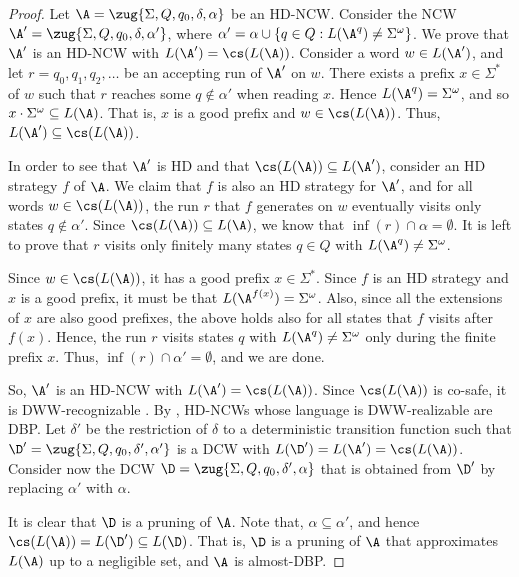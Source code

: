 \documentclass{lmcs}
\begin{document}
\begin{proof}Let $\A=\zug{\Sigma,Q,q_0,\delta,\alpha}$ be an HD-NCW. Consider the NCW $\A'=\zug{\Sigma,Q,q_0,\delta,\alpha'}$, where $\alpha'= \alpha\cup \{q\in Q : L(\A^q)\neq \Sigma^\omega\}$. We prove that $\A'$ is an HD-NCW with $L(\A')=\cs(L(\A))$. 
Consider a word $w\in L(\A')$, and let $r=q_0,q_1,q_2,\ldots$ be an accepting run of $\A'$ on $w$. There exists a prefix $x\in \Sigma^*$  of $w$ such that $r$ reaches some $q\notin \alpha'$ when reading $x$. Hence $L(\A^q)=\Sigma^\omega$, and so $x\cdot \Sigma^\omega\subseteq L(\A)$. That is, $x$ is a good prefix and $w\in \cs(L(\A))$. Thus, $L(\A')\subseteq \cs(L(\A))$. 

In order to see that $\A'$ is HD and that $\cs(L(\A))\subseteq L(\A')$, consider an HD strategy $f$ of $\A$. We claim that $f$ is also an HD strategy for $\A'$, and for all words $w\in \cs(L(\A))$, the run $r$ that $f$ generates on $w$ eventually visits only states $q\notin \alpha'$. Since $\cs(L(\A))\subseteq L(\A)$, we know that $\inf(r)\cap \alpha=\emptyset$. It is left to prove that $r$ visits only finitely many states $q\in Q$ with $L(\A^q)\neq\Sigma^\omega$. 

Since $w\in \cs(L(\A))$, it has a good prefix $x\in \Sigma^*$. Since $f$ is an HD strategy and $x$ is a good prefix, it must be that $L(\A^{f(x)})=\Sigma^\omega$. Also, since all the extensions of $x$ are also good prefixes, the above holds also for all states that $f$ visits after $f(x)$. Hence, the run $r$ visits states $q$ with $L(\A^q)\neq \Sigma^\omega$ only during the finite prefix $x$. Thus, $\inf(r)\cap \alpha'=\emptyset$, and we are done.

So, $\A'$ is an HD-NCW with $L(\A')=\cs(L(\A))$. Since $\cs(L(\A))$ is co-safe, it is DWW-recognizable \cite{Sis94}. By \cite{BKS17}, HD-NCWs whose language is DWW-realizable are DBP. Let $\delta'$ be the restriction of $\delta$ to a deterministic transition function such that $\D'=\zug{\Sigma,Q,q_0,\delta',\alpha'}$ is a DCW with $L(\D')=L(\A')=\cs(L(\A))$. Consider now the DCW $\D=\zug{\Sigma,Q,q_0,\delta',\alpha}$ that is obtained from $\D'$ by replacing $\alpha'$ with $\alpha$.

 It is clear that $\D$ is a pruning of $\A$. Note that, $\alpha\subseteq \alpha'$, and hence $\cs(L(\A))=L(\D')\subseteq L(\D)$. That is, $\D$ is a pruning of $\A$ that approximates $L(\A)$ up to a negligible set, and $\A$ is almost-DBP. 
\end{proof}
\end{document}
